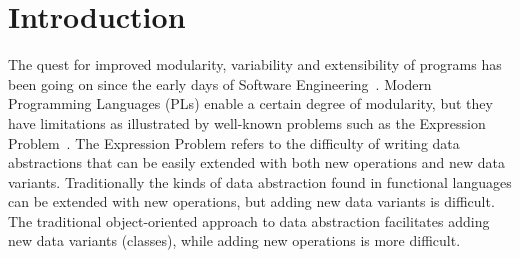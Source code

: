 \section{Introduction}\label{sec:introduction}

The quest for improved modularity, variability and extensibility of
programs has been going on since the early days of Software
Engineering~\cite{McIlroy68}. Modern Programming Languages (PLs) enable a certain
degree of modularity, but they have limitations as illustrated by
well-known problems such as the Expression Problem~\cite{wadler1998expression}. The
Expression Problem refers to the difficulty of writing data
abstractions that can be easily extended with both new operations and
new data variants. Traditionally the kinds of data abstraction found
in functional languages can be extended with new operations, but
adding new data variants is difficult. The traditional object-oriented
approach to data abstraction facilitates adding new data variants
(classes), while adding new operations is more difficult.

\begin{comment}
A reason why a solution to the Expression Problem is important in
practice is that it is necessary for the development of
\emph{Software-Product Lines} (SPLs)~\cite{}. A software-product line
is a reusable set of components, which can be combined in multiple ways
to obtain different programs. Programming languages offer a concrete
example for SPLs. A SPL for programming languages would allow us to
model various typical operations of programming languages (such as
evaluation, compilation, or parsing) for various different language
constructs (such as binding, arithmetic, conditional or loops)
independently and separately. For example, evaluation components could be defined
independently for binding and arithmetic constructs. If the language
to be implemented is the pure lambda calculus, only evaluation of
binding constructs is necessary. However, more realistic programming
languages will include arithmetic constructs, and will require
evaluation for such constructs as well. In this case
both the component for evaluation of binders and arithmetic
expressions can be combined to implement the desired functionality.
\end{comment}


